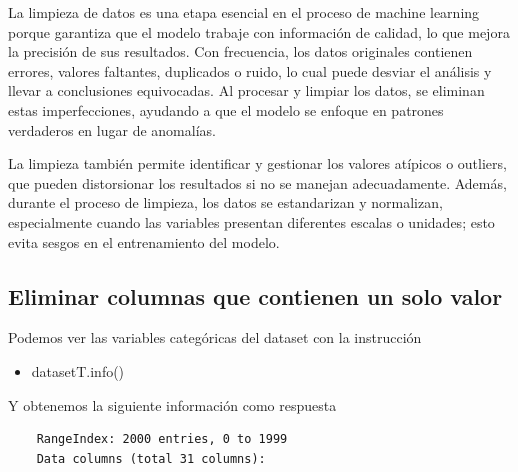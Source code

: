 La limpieza de datos es una etapa esencial en el proceso de machine learning porque garantiza 
que el modelo trabaje con información de calidad, lo que mejora la precisión de sus resultados. 
Con frecuencia, los datos originales contienen errores, valores faltantes, duplicados o ruido, 
lo cual puede desviar el análisis y llevar a conclusiones equivocadas. Al procesar y limpiar los 
datos, se eliminan estas imperfecciones, ayudando a que el modelo se enfoque en patrones verdaderos
en lugar de anomalías. \medskip

La limpieza también permite identificar y gestionar los valores atípicos o outliers, que pueden 
distorsionar los resultados si no se manejan adecuadamente. Además, durante el proceso de 
limpieza, los datos se estandarizan y normalizan, especialmente cuando las variables presentan 
diferentes escalas o unidades; esto evita sesgos en el entrenamiento del modelo. 




    \subsection{Eliminar columnas que contienen un solo valor} 

    Podemos ver las variables categóricas del dataset con la instrucción \medskip
    \begin{itemize}
    \item datasetT.info()
    \end{itemize}
    \newpage
    Y obtenemos la siguiente información como respuesta
    
    \begin{verbatim}
    RangeIndex: 2000 entries, 0 to 1999 
    Data columns (total 31 columns):
    \end{verbatim}

